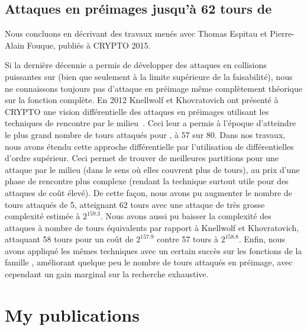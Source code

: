 \subsection{Attaques en préimages jusqu'à 62 tours de \shaone \cite{DBLP:conf/crypto/EspitauFK15}}

Nous concluons en décrivant des travaux menés avec Thomas Espitau et Pierre-Alain Fouque, publiés à CRYPTO 2015.

\medskip

Si la dernière décennie a permis de développer des attaques en collisions puissantes sur \shaone (bien que seulement à la limite supérieure de la faisabilité), nous ne connaissons toujours
pas d'attaque en préimage même complètement théorique sur la fonction complète.
En 2012 Knellwolf et Khovratovich ont présenté à CRYPTO une vision différentielle des attaques en préimages utilisant les techniques de rencontre par le milieu~\cite{DBLP:conf/crypto/KnellwolfK12}.
Ceci leur a permis à l'époque d'atteindre le plus grand nombre de tours attaqués pour \shaone, à 57 sur 80.
Dans nos travaux, nous avons étendu cette approche différentielle par l'utilisation de différentielles d'ordre supérieur. Ceci permet de trouver de meilleures partitions pour une attaque par
le milieu (dans le sens où elles couvrent plus de tours), au prix d'une phase de rencontre plus complexe (rendant la technique surtout utile pour des attaques de coût élevé). De cette façon,
nous avons pu augmenter le nombre de tours attaqués de 5, atteignant 62 tours avec une attaque de très grosse complexité estimée à $2^{159.3}$.
Nous avons aussi pu baisser la complexité des attaques à nombre
de tours équivalents par rapport à Knellwolf et Khovratovich, attaquant 58 tours pour un coût de $2^{157.9}$ contre 57 tours à $2^{158.8}$. Enfin, nous avons appliqué les mêmes
techniques avec un certain succès sur les fonctions de la famille \blake, améliorant quelque peu le nombre de tours attaqués en préimage, avec cependant un gain marginal sur la
recherche exhaustive. 


\newcommand{\mybibtitle}[1]{\textsf{#1.}\hfil}
\newcommand{\mybibauth}[1]{#1.}
\newcommand{\mybibconf}[1]{\hspace*{\stretch{1}}\mbox{(#1)}}

\setcounter{section}{0}
\renewcommand\thesection{\Alph{section}}
\section[Mes publications]{My publications}


